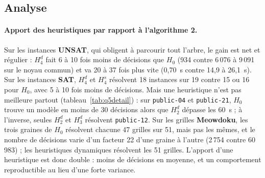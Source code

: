 \documentclass[11pt,a4paper]{article}
\begin{document}
\subsection{Analyse}

\paragraph{Apport des heuristiques par rapport à l'algorithme 2.} Sur les instances
\textbf{UNSAT}, qui obligent à parcourir tout l'arbre, le gain est net et régulier :
$H_4^d$ fait 6 à 10 fois moins de décisions que $H_0$ (934 contre 6\,076 à 9\,091 sur le noyau
commun) et va 20 à 37 fois plus vite (0,70~s contre 14,9 à 26,1~s). Sur les instances
\textbf{SAT}, $H_4^d$ et $H_4^s$ résolvent 18 instances sur 19 contre 15 ou 16 pour $H_0$, avec
5 à 10 fois moins de décisions. Mais une heuristique n'est pas meilleure partout
(tableau~\ref{tab:q5detail}) : sur \texttt{public-04} et \texttt{public-21}, $H_0$ trouve un
modèle en moins de 30 décisions alors que $H_2^d$ dépasse les 60~s ; à l'inverse, seules
$H_2^d$ et $H_3^d$ résolvent \texttt{public-12}. Sur les grilles \textbf{Meowdoku}, les trois
graines de $H_0$ résolvent chacune 47 grilles sur 51, mais pas les mêmes, et le nombre de
décisions varie d'un facteur 22 d'une graine à l'autre (2\,754 contre 60\,983) ; les heuristiques
dynamiques résolvent les 51 grilles. L'apport d'une heuristique est donc double : moins de
décisions en moyenne, et un comportement reproductible au lieu d'une forte variance.
\end{document}
